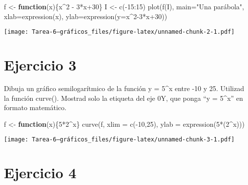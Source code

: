 \documentclass[
]{article}
\newenvironment{Shaded}{\begin{snugshade}}{\end{snugshade}}
\newcommand{\AttributeTok}[1]{\textcolor[rgb]{0.77,0.63,0.00}{#1}}
\newcommand{\ControlFlowTok}[1]{\textcolor[rgb]{0.13,0.29,0.53}{\textbf{#1}}}
\newcommand{\DecValTok}[1]{\textcolor[rgb]{0.00,0.00,0.81}{#1}}
\newcommand{\FunctionTok}[1]{\textcolor[rgb]{0.00,0.00,0.00}{#1}}
\newcommand{\NormalTok}[1]{#1}
\newcommand{\OtherTok}[1]{\textcolor[rgb]{0.56,0.35,0.01}{#1}}
\newcommand{\SpecialCharTok}[1]{\textcolor[rgb]{0.00,0.00,0.00}{#1}}
\newcommand{\StringTok}[1]{\textcolor[rgb]{0.31,0.60,0.02}{#1}}
\begin{document}
\begin{Shaded}
\begin{Highlighting}[]
\NormalTok{f }\OtherTok{\textless{}{-}} \ControlFlowTok{function}\NormalTok{(x)\{x}\SpecialCharTok{\^{}}\DecValTok{2} \SpecialCharTok{{-}} \DecValTok{3}\SpecialCharTok{*}\NormalTok{x}\SpecialCharTok{+}\DecValTok{30}\NormalTok{\}}
\NormalTok{I }\OtherTok{\textless{}{-}} \FunctionTok{c}\NormalTok{(}\SpecialCharTok{{-}}\DecValTok{15}\SpecialCharTok{:}\DecValTok{15}\NormalTok{)}
\FunctionTok{plot}\NormalTok{(}\FunctionTok{f}\NormalTok{(I), }\AttributeTok{main=}\StringTok{"Una parábola"}\NormalTok{, }\AttributeTok{xlab=}\FunctionTok{expression}\NormalTok{(x), }\AttributeTok{ylab=}\FunctionTok{expression}\NormalTok{(}\AttributeTok{y=}\NormalTok{x}\SpecialCharTok{\^{}}\DecValTok{2{-}3}\SpecialCharTok{*}\NormalTok{x}\SpecialCharTok{+}\DecValTok{30}\NormalTok{))}
\end{Highlighting}
\end{Shaded}

\texttt{[image: Tarea-6--gráficos\_files/figure-latex/unnamed-chunk-2-1.pdf]}

\hypertarget{ejercicio-3}{%
\section{Ejercicio 3}\label{ejercicio-3}}

Dibuja un gráfico semilogarítmico de la función y = 5\^{}x entre
-10 y 25. Utilizad la función curve(). Mostrad solo la etiqueta del eje
0Y, que ponga ``y = 5\^{}x'' en formato matemático.

\begin{Shaded}
\begin{Highlighting}[]
\NormalTok{f }\OtherTok{\textless{}{-}} \ControlFlowTok{function}\NormalTok{(x)\{}\DecValTok{5}\SpecialCharTok{*}\DecValTok{2}\SpecialCharTok{\^{}}\NormalTok{x\}}
\FunctionTok{curve}\NormalTok{(f, }\AttributeTok{xlim =} \FunctionTok{c}\NormalTok{(}\SpecialCharTok{{-}}\DecValTok{10}\NormalTok{,}\DecValTok{25}\NormalTok{), }\AttributeTok{ylab =} \FunctionTok{expression}\NormalTok{(}\DecValTok{5}\SpecialCharTok{*}\NormalTok{(}\DecValTok{2}\SpecialCharTok{\^{}}\NormalTok{x)))}
\end{Highlighting}
\end{Shaded}

\texttt{[image: Tarea-6--gráficos\_files/figure-latex/unnamed-chunk-3-1.pdf]}

\hypertarget{ejercicio-4}{%
\section{Ejercicio 4}\label{ejercicio-4}}
\end{document}
